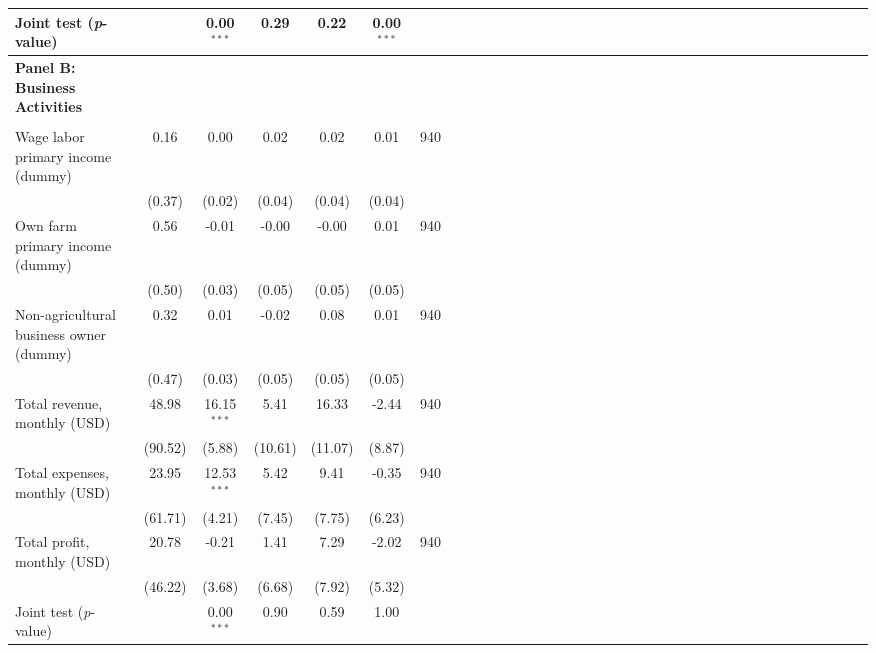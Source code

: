 {\begin{tabular}{l*{6}{SSSSSc}}
\midrule Joint test (\emph{p}-value)&         &0.00$^{***}$&     0.29&     0.22&0.00$^{***}$&         \\
\midrule \textbf{Panel B: Business Activities}&         &         &         &         &         &         \\
          &         &         &         &         &         &         \\
Wage labor primary income (dummy)&     0.16&     0.00&     0.02&     0.02&     0.01&      940\\
          &   (0.37)&   (0.02)&   (0.04)&   (0.04)&   (0.04)&         \\
Own farm  primary income (dummy)&     0.56&    -0.01&    -0.00&    -0.00&     0.01&      940\\
          &   (0.50)&   (0.03)&   (0.05)&   (0.05)&   (0.05)&         \\
Non-agricultural business owner (dummy)&     0.32&     0.01&    -0.02&     0.08&     0.01&      940\\
          &   (0.47)&   (0.03)&   (0.05)&   (0.05)&   (0.05)&         \\
Total revenue, monthly (USD)&    48.98&16.15$^{***}$&     5.41&    16.33&    -2.44&      940\\
          &  (90.52)&   (5.88)&  (10.61)&  (11.07)&   (8.87)&         \\
Total expenses, monthly (USD)&    23.95&12.53$^{***}$&     5.42&     9.41&    -0.35&      940\\
          &  (61.71)&   (4.21)&   (7.45)&   (7.75)&   (6.23)&         \\
Total profit, monthly (USD)&    20.78&    -0.21&     1.41&     7.29&    -2.02&      940\\
          &  (46.22)&   (3.68)&   (6.68)&   (7.92)&   (5.32)&         \\
\midrule Joint test (\emph{p}-value)&         &0.00$^{***}$&     0.90&     0.59&     1.00&         \\
\bottomrule
\end{tabular}
}
